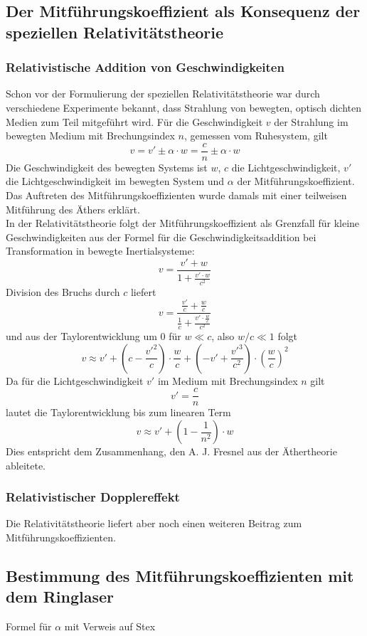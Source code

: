 \subsection{Der Mitführungskoeffizient als Konsequenz der speziellen Relativitätstheorie}

\subsubsection*{Relativistische Addition von Geschwindigkeiten}
Schon vor der Formulierung der speziellen Relativitätstheorie war durch verschiedene Experimente bekannt,
dass Strahlung von bewegten, optisch dichten Medien zum Teil mitgeführt wird.
Für die Geschwindigkeit $v$ der Strahlung im bewegten Medium mit Brechungsindex $n$, gemessen vom Ruhesystem,
gilt
\begin{equation}
\label{}
v = v' \pm \alpha \cdot w = \frac{c}{n} \pm \alpha \cdot w
\end{equation}
Die Geschwindigkeit des bewegten Systems ist $w$, $c$ die Lichtgeschwindigkeit,
$v'$ die Lichtgeschwindigkeit im bewegten System und
$\alpha$ der Mitführungskoeffizient.
Das Auftreten des Mitführungskoeffizienten wurde damals mit einer teilweisen Mitführung des Äthers erklärt.\\
In der Relativitätstheorie folgt der Mitführungskoeffizient als Grenzfall für kleine Geschwindigkeiten
aus der Formel für die Geschwindigkeitsaddition bei Transformation in bewegte Inertialsysteme:
\begin{equation}
\label{}
v=\frac{v'+w}{1+\frac{v' \cdot w}{c^2}}
\end{equation}
Division des Bruchs durch $c$ liefert
\begin{equation}
\label{}
v=\frac{\frac{v'}{c}+\frac{w}{c}}{\frac{1}{c}+\frac{v' \cdot \frac{w}{c}}{c^2}}
\end{equation}
und aus der Taylorentwicklung um 0 für $w \ll c$, also $w/c \ll 1$ folgt
\begin{equation}
\label{}
v \approx v' + (c-\frac{v'^2}{c})\cdot \frac{w}{c}+ (-v'+\frac{v'^3}{c^2})\cdot \left(\frac{w}{c}\right)^2
\end{equation}
Da für die Lichtgeschwindigkeit $v'$ im Medium mit Brechungsindex $n$ gilt
\begin{equation}
\label{}
v'=\frac{c}{n}
\end{equation}
lautet die Taylorentwicklung bis zum linearen Term
\begin{equation}
\label{}
v \approx v' + (1-\frac{1}{n^2})\cdot w
\end{equation}
Dies entspricht dem Zusammenhang, den A. J. Fresnel aus der Äthertheorie ableitete.

\subsubsection*{Relativistischer Dopplereffekt}
Die Relativitätstheorie liefert aber noch einen weiteren Beitrag zum Mitführungskoeffizienten.




\subsection{Bestimmung des Mitführungskoeffizienten mit dem Ringlaser}


Formel für $\alpha$ mit Verweis auf Stex